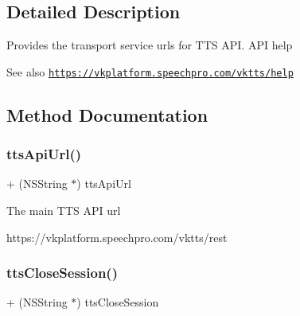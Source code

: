 \subsection{Detailed Description}
Provides the transport service urls for T\+TS A\+PI. A\+PI help \begin{DoxySeeAlso}{See also}
\href{https://vkplatform.speechpro.com/vktts/help}{\tt https\+://vkplatform.\+speechpro.\+com/vktts/help} 
\end{DoxySeeAlso}


\subsection{Method Documentation}
\hypertarget{interface_s_t_c_t_t_s_u_r_l_manager_a35109e921ad45728ec11306001c520e8}{}\label{interface_s_t_c_t_t_s_u_r_l_manager_a35109e921ad45728ec11306001c520e8} 
\subsubsection{\texorpdfstring{tts\+Api\+Url()}{ttsApiUrl()}}
{\footnotesize\ttfamily + (N\+S\+String $\ast$) tts\+Api\+Url \begin{DoxyParamCaption}{ }\end{DoxyParamCaption}}

The main T\+TS A\+PI url 
\begin{DoxyCode}
https:\textcolor{comment}{//vkplatform.speechpro.com/vktts/rest}
\end{DoxyCode}
 \hypertarget{interface_s_t_c_t_t_s_u_r_l_manager_ac3165e245d749f97fce2fe5f4bca3b77}{}\label{interface_s_t_c_t_t_s_u_r_l_manager_ac3165e245d749f97fce2fe5f4bca3b77} 
\subsubsection{\texorpdfstring{tts\+Close\+Session()}{ttsCloseSession()}}
{\footnotesize\ttfamily + (N\+S\+String $\ast$) tts\+Close\+Session \begin{DoxyParamCaption}{ }\end{DoxyParamCaption}}

